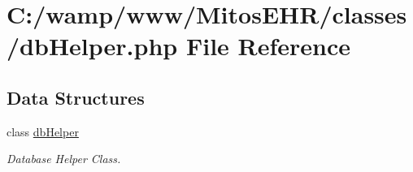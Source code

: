 \hypertarget{db_helper_8php}{\section{\-C\-:/wamp/www/\-Mitos\-E\-H\-R/classes/db\-Helper.php \-File \-Reference}
\label{db_helper_8php}
}
\subsection*{\-Data \-Structures}
\begin{DoxyCompactItemize}
\item 
class \hyperlink{classdb_helper}{db\-Helper}
\begin{DoxyCompactList}\small\item\em \-Database \-Helper \-Class. \end{DoxyCompactList}\end{DoxyCompactItemize}
